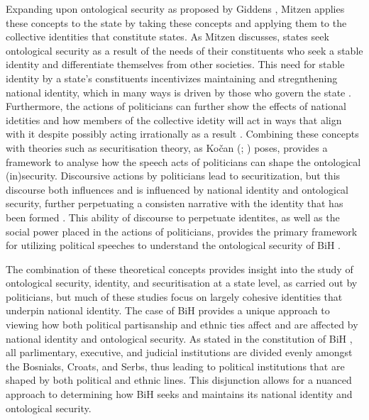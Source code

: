 Expanding upon ontological security as proposed by Giddens \parencite*{giddensModernitySelfidentitySelf2009}, Mitzen \parencite*{mitzenOntologicalSecurityWorld2006} applies these concepts to the state by taking these concepts and applying them to the collective identities that constitute states. As Mitzen \parencite*[][p. 352]{mitzenOntologicalSecurityWorld2006} discusses, states seek ontological security as a result of the needs of their constituents who seek a stable identity and differentiate themselves from other societies. This need for stable identity by a state's constituents incentivizes maintaining and stregnthening national identity, which in many ways is driven by those who govern the state \Parencites[][p. 352]{mitzenOntologicalSecurityWorld2006}[][p. 29]{kocanIdentityOntologicalSecurity2023}. Furthermore, the actions of politicians can further show the effects of national idetities and how members of the collective idetity will act in ways that align with it despite possibly acting irrationally as a result \parencite[][p. 352]{mitzenOntologicalSecurityWorld2006}. Combining these concepts with theories such as securitisation theory, as Kočan (\cite*[][p. 28-30]{kocanIdentityOntologicalSecurity2023}; \cite[][p. 23-26]{buzan1998}) poses, provides a framework to analyse how the speech acts of politicians can shape the ontological (in)security. Discoursive actions by politicians lead to securitization, but this discourse both influences and is influenced by national identity and ontological security, further perpetuating a consisten narrative with the identity that has been formed \Parencites[][p. 29-31]{kocanIdentityOntologicalSecurity2023}[][p. 31-32]{buzan1998}. This ability of discourse to perpetuate identites, as well as the social power placed in the actions of politicians, provides the primary framework for utilizing political speeches to understand the ontological security of BiH \Parencite[][p. 32-33]{buzan1998}.

The combination of these theoretical concepts provides insight into the study of ontological security, identity, and securitisation at a state level, as carried out by politicians, but much of these studies focus on largely cohesive identities that underpin national identity. The case of BiH provides a unique approach to viewing how both political partisanship and ethnic ties affect and are affected by national identity and ontological security. As stated in the constitution of BiH \parencite*[][Annex 4]{oscemissiontobosniaandherzegovina1995}, all parlimentary, executive, and judicial institutions are divided evenly amongst the Bosniaks, Croats, and Serbs, thus leading to political institutions that are shaped by both political and ethnic lines. This disjunction allows for a nuanced approach to determining how BiH seeks and maintains its national identity and ontological security.

